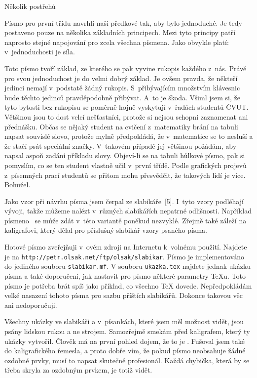 \sub Několik postřehů

Písmo pro první třídu navrhli naši předkové tak, aby bylo jednoduché. Je
tedy postaveno pouze na několika základních principech. Mezi tyto principy
patří naprosto stejné napojování pro zcela všechna písmena.
Jako obvykle platí: v~jednoduchosti je síla.

Toto písmo tvoří základ, ze kterého se pak vyvine rukopis každého z~nás.
Právě pro svou jednoduchost je do velmi dobrý základ. Je ovšem pravda, že
někteří jedinci nemají v~podstatě žádný rukopis. S~přibývajícím množstvím
klávesnic bude těchto jedinců pravděpodobně přibývat. A~to je škoda. Všiml
jsem si, že tyto bytosti bez rukopisu se poměrně hojně vyskytují v~řadách
studentů ČVUT. Většinou jsou to dost velcí nešťastníci, protože si nejsou
schopni zaznamenat ani přednášku. Občas se nějaký student na cvičení
z~matematiky brání na tabuli napsat souvislé slovo, protože mylně předpokládá,
že v~matematice se to nesluší a že stačí psát speciální značky. V~takovém
případě jej většinou požádám, aby napsal aspoň zadání příkladu slovy.
Objeví-li se na tabuli hůlkové písmo, pak si pomyslím, co se ten student
vlastně učil v~první třídě. Podle grafických projevů z~písemných prací
studentů se přitom mohu přesvědčit, že takových lidí je více. Bohužel.

Jako vzor při návrhu písma jsem čerpal ze slabikáře~[5]. I~tyto vzory
podléhají vývoji, takže můžeme nalézt v~různých slabikářích nepatrné
odlišnosti. Například písmeno~ se může zdát v~této variantě poněkud
nezvyklé. Zřejmě také záleží na kaligrafovi, který dělal pro příslušný
slabikář vzory psaného písma.

Hotové písmo zveřejňuji v~\mf{}ovém zdroji na Internetu
k~volnému použití. Najdete je na
{\tt http://petr.olsak.net/ftp/olsak/slabikar}.
Písmo je implementováno do jediného souboru {\tt slabikar.mf}.
V souboru {\tt ukazka.tex} najdete jednak ukázku písma a také
doporučení, jak nastavit pro písmo některé parametry \TeX{}u.
Toto písmo je potřeba brát spíš jako příklad, co všechno \TeX{} dovede.
Nepředpokládám velké nasazení tohoto písma pro sazbu příštích
slabikářů. Dokonce takovou věc ani nedoporučuji.

Všechny ukázky ve slabikáři a v~písankách, které jsem měl možnost vidět,
jsou psány lidskou rukou a ne strojem. Samozřejmě smekám před kaligrafem,
který ty ukázky vytvořil. Člověk má na první pohled dojem, že to je
. Fušoval jsem také do kaligrafického řemesla, a proto
dobře vím, že pokud písmo neobsahuje žádné ozdobné prvky, musí to napsat
skutečně profesionál. Každá chybička, která by se třeba skryla za ozdobným
prvkem, je totiž vidět.

